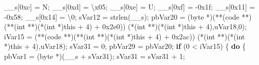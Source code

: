 \documentclass[
]{article}
\newenvironment{Shaded}{}{}
\newcommand{\BaseNTok}[1]{\textcolor[rgb]{0.25,0.63,0.44}{#1}}
\newcommand{\CharTok}[1]{\textcolor[rgb]{0.25,0.44,0.63}{#1}}
\newcommand{\ControlFlowTok}[1]{\textcolor[rgb]{0.00,0.44,0.13}{\textbf{#1}}}
\newcommand{\DataTypeTok}[1]{\textcolor[rgb]{0.56,0.13,0.00}{#1}}
\newcommand{\DecValTok}[1]{\textcolor[rgb]{0.25,0.63,0.44}{#1}}
\newcommand{\NormalTok}[1]{#1}
\newcommand{\OperatorTok}[1]{\textcolor[rgb]{0.40,0.40,0.40}{#1}}
\newcommand{\SpecialCharTok}[1]{\textcolor[rgb]{0.25,0.44,0.63}{#1}}
\begin{document}
\begin{Shaded}
\begin{Highlighting}[]
\NormalTok{      \_\_s}\OperatorTok{[}\BaseNTok{0xc}\OperatorTok{]} \OperatorTok{=} \CharTok{\textquotesingle{}N\textquotesingle{}}\OperatorTok{;}
\NormalTok{      \_\_s}\OperatorTok{[}\BaseNTok{0xd}\OperatorTok{]} \OperatorTok{=} \CharTok{\textquotesingle{}}\SpecialCharTok{\textbackslash{}x05}\CharTok{\textquotesingle{}}\OperatorTok{;}
\NormalTok{      \_\_s}\OperatorTok{[}\BaseNTok{0xe}\OperatorTok{]} \OperatorTok{=} \CharTok{\textquotesingle{}U\textquotesingle{}}\OperatorTok{;}
\NormalTok{      \_\_s}\OperatorTok{[}\BaseNTok{0xf}\OperatorTok{]} \OperatorTok{=} \OperatorTok{{-}}\BaseNTok{0x1f}\OperatorTok{;}
\NormalTok{      \_\_s}\OperatorTok{[}\BaseNTok{0x11}\OperatorTok{]} \OperatorTok{=} \OperatorTok{{-}}\BaseNTok{0x58}\OperatorTok{;}
\NormalTok{      \_\_s}\OperatorTok{[}\BaseNTok{0x14}\OperatorTok{]} \OperatorTok{=} \CharTok{\textquotesingle{}}\SpecialCharTok{\textbackslash{}0}\CharTok{\textquotesingle{}}\OperatorTok{;}
\NormalTok{      sVar12 }\OperatorTok{=}\NormalTok{ strlen}\OperatorTok{(}\NormalTok{\_\_s}\OperatorTok{);}
\NormalTok{      pbVar20 }\OperatorTok{=} \OperatorTok{(}\NormalTok{byte }\OperatorTok{*)(**(}\NormalTok{code }\OperatorTok{**)(**(}\DataTypeTok{int} \OperatorTok{**)(*(}\DataTypeTok{int} \OperatorTok{*)}\NormalTok{this }\OperatorTok{+} \DecValTok{4}\OperatorTok{)} \OperatorTok{+} \BaseNTok{0x2e0}\OperatorTok{))}
                                  \OperatorTok{(*(}\DataTypeTok{int} \OperatorTok{**)(*(}\DataTypeTok{int} \OperatorTok{*)}\NormalTok{this }\OperatorTok{+} \DecValTok{4}\OperatorTok{),}\NormalTok{uVar18}\OperatorTok{,}\DecValTok{0}\OperatorTok{);}
\NormalTok{      iVar15 }\OperatorTok{=} \OperatorTok{(**(}\NormalTok{code }\OperatorTok{**)(**(}\DataTypeTok{int} \OperatorTok{**)(*(}\DataTypeTok{int} \OperatorTok{*)}\NormalTok{this }\OperatorTok{+} \DecValTok{4}\OperatorTok{)} \OperatorTok{+} \BaseNTok{0x2ac}\OperatorTok{))}
                         \OperatorTok{(*(}\DataTypeTok{int} \OperatorTok{**)(*(}\DataTypeTok{int} \OperatorTok{*)}\NormalTok{this }\OperatorTok{+} \DecValTok{4}\OperatorTok{),}\NormalTok{uVar18}\OperatorTok{);}
\NormalTok{      sVar31 }\OperatorTok{=} \DecValTok{0}\OperatorTok{;}
\NormalTok{      pbVar29 }\OperatorTok{=}\NormalTok{ pbVar20}\OperatorTok{;}
      \ControlFlowTok{if} \OperatorTok{(}\DecValTok{0} \OperatorTok{\textless{}}\NormalTok{ iVar15}\OperatorTok{)} \OperatorTok{\{}
        \ControlFlowTok{do} \OperatorTok{\{}
\NormalTok{          pbVar1 }\OperatorTok{=} \OperatorTok{(}\NormalTok{byte }\OperatorTok{*)(}\NormalTok{\_\_s }\OperatorTok{+}\NormalTok{ sVar31}\OperatorTok{);}
\NormalTok{          sVar31 }\OperatorTok{=}\NormalTok{ sVar31 }\OperatorTok{+} \DecValTok{1}\OperatorTok{;}

\end{Highlighting}
\end{Shaded}
\end{document}
